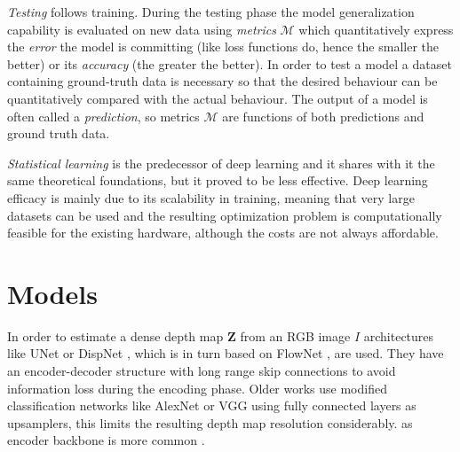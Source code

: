 \textit{Testing} follows training.
During the testing phase the model generalization capability is evaluated on new data using \textit{metrics} $\mathcal{M}$ which quantitatively express the \textit{error} the model is committing (like loss functions do, hence the smaller the better) or its \textit{accuracy} (the greater the better).
In order to test a model a dataset containing ground-truth data is necessary so that the desired behaviour can be quantitatively compared with the actual behaviour.
The output of a model is often called a \textit{prediction}, so metrics $\mathcal{M}$ are functions of both predictions and ground truth data.


\textit{Statistical learning} is the predecessor of deep learning and it shares with it the same theoretical foundations, but it proved to be less effective.
Deep learning efficacy is mainly due to its scalability in training, meaning that very large datasets can be used and the resulting optimization problem is computationally feasible for the existing hardware, although the costs are not always affordable.

%
%
%


\section{Models}
In order to estimate a dense depth map $\mathbf{Z}$ from an RGB image $I$ architectures like UNet \cite{UNet} or DispNet \cite{DispNet}, which is in turn based on FlowNet \cite{FlowNet}, are used.
They have an encoder-decoder structure with long range skip connections to avoid information loss during the encoding phase. 
Older works \cite{Eigen} \cite{Eigen2} use modified classification networks like AlexNet \cite{AlexNet} or VGG \cite{VGG} using fully connected layers as upsamplers, this limits the resulting depth map resolution considerably.
\cite{ResNet} as encoder backbone is more common \cite{MonoDepth2}.

